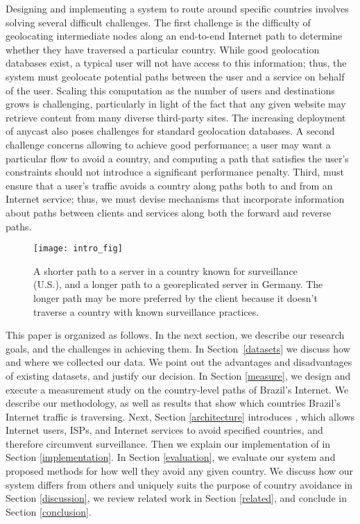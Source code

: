 Designing and implementing a system to route around specific countries
involves solving several difficult challenges. The first challenge is
the difficulty of geolocating intermediate nodes along an end-to-end
Internet path to determine whether they have traversed a particular
country. While good geolocation databases exist, a typical user will not
have access to this information; thus, the system must geolocate
potential paths between the user and a service on behalf of the
user. Scaling this computation as the number of users and destinations grows
is challenging, particularly in light of the fact that any given website
may retrieve content from many diverse third-party sites. The increasing
deployment of anycast also poses challenges for standard geolocation
databases.    A
second challenge concerns allowing \system{} to achieve good
performance; a user may want a particular flow to avoid a country, and
computing a path that satisfies the user's constraints should not
introduce a significant performance penalty. Third, \system{} must
ensure that a user's traffic avoids a country along paths both to and
from an Internet service; thus, we must devise mechanisms that
incorporate information about paths between clients and services along
both the forward and reverse paths.



\begin{figure}[t]
\centering
\texttt{[image: intro\_fig]}
\caption{A shorter path to a server in a country known for surveillance (U.S.), and a longer path to a georeplicated server in Germany.  The longer path may be more preferred by the client because it doesn't traverse a country with known surveillance practices.}
\label{fig:intro}
\end{figure}

 This paper is organized as follows.  In the next section, we describe
our research goals, and the challenges in achieving them.  In
Section~\ref{datasets} we discuss how and where we collected our data.
We point out the advantages and disadvantages of existing datasets, and
justify our decision.  In Section \ref{measure}, we design and execute a
measurement study on the country-level paths of Brazil's Internet.  We
describe our methodology, as well as results that show which countries
Brazil's Internet traffic is traversing.  Next, Section
\ref{architecture} introduces \system{}, which allows Internet users, ISPs,
and Internet services to avoid specified countries, and therefore
circumvent surveillance.  Then we explain our implementation of \system{}
in Section \ref{implementation}.  In Section \ref{evaluation}, we
evaluate our system and proposed methods for how well they avoid any
given country.  We discuss how our system differs from others and
uniquely suits the purpose of country avoidance in Section
\ref{discussion}, we review related work in Section \ref{related}, and
conclude in Section \ref{conclusion}. 
